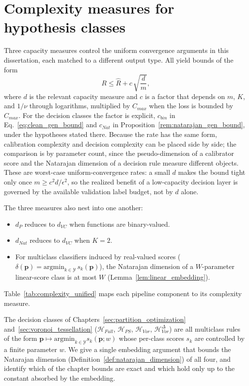 \chapter{Complexity measures for hypothesis classes}\label{app:complexity}

Three capacity measures control the uniform convergence arguments in this dissertation, each matched to a different output type. All yield bounds of the form
\begin{equation}
    R \leq \hat{R} + c\, \sqrt{\frac{d}{m}},
\end{equation}
where $d$ is the relevant capacity measure and $c$ is a factor that depends on $m$, $K$, and $1/\nu$ through logarithms, multiplied by $C_{max}$ when the loss is bounded by $C_{max}$. For the decision classes the factor is explicit, $c_{bin}$ in Eq.~\eqref{eq:clean_gen_bound} and $c_{Nat}$ in Proposition~\ref{rem:natarajan_gen_bound}, under the hypotheses stated there. Because the rate has the same form, calibration complexity and decision complexity can be placed side by side; the comparison is by parameter count, since the pseudo-dimension of a calibrator score and the Natarajan dimension of a decision rule measure different objects. These are worst-case uniform-convergence rates: a small $d$ makes the bound tight only once $m \geq c^2 d/\epsilon^2$, so the realized benefit of a low-capacity decision layer is governed by the available validation label budget, not by $d$ alone.

The three measures also nest into one another:
\begin{itemize}
    \item $d_P$ reduces to $d_{VC}$ when functions are binary-valued.
    \item $d_{Nat}$ reduces to $d_{VC}$ when $K = 2$.
    \item For multiclass classifiers induced by real-valued scores
          ($\delta(\mathbf{p}) = \mathrm{argmin}_{k \in \mathcal{Y}}\, s_k(\mathbf{p})$),
          the Natarajan dimension of a $W$-parameter linear-score class is at most $W$
          (Lemma~\ref{lem:linear_embedding}).
\end{itemize}

Table~\ref{tab:complexity_unified} maps each pipeline component to its complexity measure.



The decision classes of Chapters~\ref{sec:partition_optimization} and~\ref{sec:voronoi_tessellation} ($\mathcal{H}_{Full}$, $\mathcal{H}_{PS}$, $\mathcal{H}_{Vor}$, $\mathcal{H}_{Vor}^{\Delta}$) are all multiclass rules of the form $\mathbf{p} \mapsto \mathrm{argmin}_{k \in \mathcal{Y}} s_k(\mathbf{p}; w)$ whose per-class scores $s_k$ are controlled by a finite parameter $w$. We give a single embedding argument that bounds the Natarajan dimension (Definition~\ref{def:natarajan_dimension}) of all four, and identify which of the chapter bounds are exact and which hold only up to the constant absorbed by the embedding.

